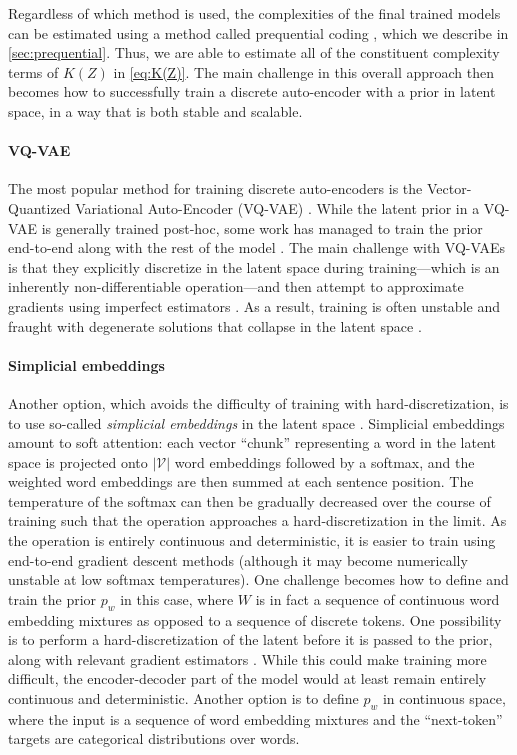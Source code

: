 \documentclass{article} %
\begin{document}
\begin{appendices}
Regardless of which method is used, the complexities of the final trained models can be estimated using a method called prequential coding \citep{blier2018description}, which we describe in \cref{sec:prequential}. Thus, we are able to estimate all of the constituent complexity terms of $K(Z)$ in \cref{eq:K(Z)}. The main challenge in this overall approach then becomes how to successfully train a discrete auto-encoder with a prior in latent space, in a way that is both stable and scalable.

\paragraph{VQ-VAE}

The most popular method for training discrete auto-encoders is the Vector-Quantized Variational Auto-Encoder (VQ-VAE) \citep{van2017neural}. While the latent prior in a VQ-VAE is generally trained post-hoc, some work has managed to train the prior end-to-end along with the rest of the model \citep{jones2020discrete,yasuda2021end,cohen2022diffusion}. The main challenge with VQ-VAEs is that they explicitly discretize in the latent space during training---which is an inherently non-differentiable operation---and then attempt to approximate gradients using imperfect estimators \citep{bengio2013estimating,jang2016categorical}. As a result, training is often unstable and fraught with degenerate solutions that collapse in the latent space \citep{lancucki2020robust}.

\paragraph{Simplicial embeddings}

Another option, which avoids the difficulty of training with hard-discretization, is to use so-called \textit{simplicial embeddings} in the latent space \citep{lavoie2023simplicial}. Simplicial embeddings amount to soft attention: each vector ``chunk'' representing a word in the latent space is projected onto $|\mathcal{V}|$ word embeddings followed by a softmax, and the weighted word embeddings are then summed at each sentence position. The temperature of the softmax can then be gradually decreased over the course of training such that the operation approaches a hard-discretization in the limit. As the operation is entirely continuous and deterministic, it is easier to train using end-to-end gradient descent methods (although it may become numerically unstable at low softmax temperatures). One challenge becomes how to define and train the prior $p_w$ in this case, where $W$ is in fact a sequence of continuous word embedding mixtures as opposed to a sequence of discrete tokens. One possibility is to perform a hard-discretization of the latent before it is passed to the prior, along with relevant gradient estimators \citep[e.g.][]{bengio2013estimating,jang2016categorical}. While this could make training more difficult, the encoder-decoder part of the model would at least remain entirely continuous and deterministic. Another option is to define $p_w$ in continuous space, where the input is a sequence of word embedding mixtures and the ``next-token'' targets are categorical distributions over words.


\end{appendices}
\end{document}
